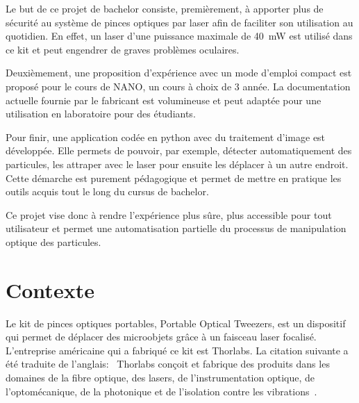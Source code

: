 Le but de ce projet de bachelor consiste, premièrement, à apporter plus de sécurité au système de pinces optiques par laser afin de faciliter son utilisation au quotidien. En effet, un laser d'une puissance maximale de 40~mW est utilisé dans ce kit et peut engendrer de graves problèmes oculaires.

Deuxièmement, une proposition d'expérience avec un mode d'emploi compact est proposé pour le cours de NANO, un cours à choix de 3\ieme{} année. La documentation actuelle fournie par le fabricant est volumineuse et peut adaptée pour une utilisation en laboratoire pour des étudiants.

Pour finir, une application codée en python avec du traitement d'image est développée. Elle permets de pouvoir, par exemple, détecter automatiquement des particules, les attraper avec le laser pour ensuite les déplacer à un autre endroit. Cette démarche est purement pédagogique et permet de mettre en pratique les outils acquis tout le long du cursus de bachelor.

Ce projet vise donc à rendre l'expérience plus sûre, plus accessible pour tout utilisateur et permet une automatisation partielle du processus de manipulation optique des particules.
\newpage
\section{Contexte}

Le kit de pinces optiques portables, Portable Optical Tweezers, est un dispositif qui permet de déplacer des microobjets grâce à un faisceau laser focalisé. L'entreprise américaine qui a fabriqué ce kit est Thorlabs. La citation suivante a été traduite de l'anglais: \guillemotleft{}~Thorlabs conçoit et fabrique des produits dans les domaines de la fibre optique, des lasers, de l'instrumentation optique, de l'optomécanique, de la photonique et de l'isolation contre les vibrations~\guillemotright{}\cite{thorlabsWikipedia}.

